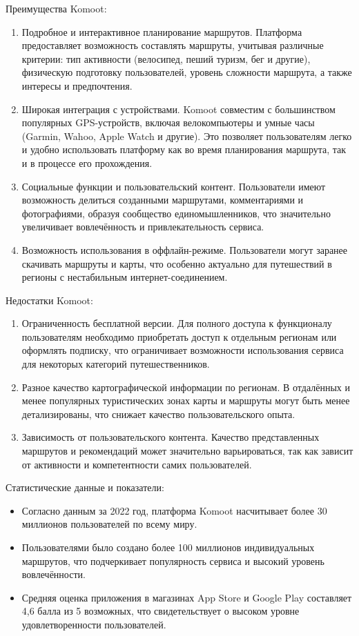 Преимущества Komoot:
\begin{enumerate}
    \item Подробное и интерактивное планирование маршрутов. Платформа предоставляет возможность составлять маршруты, учитывая различные критерии: тип активности (велосипед, пеший туризм, бег и другие), физическую подготовку пользователей, уровень сложности маршрута, а также интересы и предпочтения.
    \item Широкая интеграция с устройствами. Komoot совместим с большинством популярных GPS-устройств, включая велокомпьютеры и умные часы (Garmin, Wahoo, Apple Watch и другие). Это позволяет пользователям легко и удобно использовать платформу как во время планирования маршрута, так и в процессе его прохождения.
    \item Социальные функции и пользовательский контент. Пользователи имеют возможность делиться созданными маршрутами, комментариями и фотографиями, образуя сообщество единомышленников, что значительно увеличивает вовлечённость и привлекательность сервиса.
    \item Возможность использования в оффлайн-режиме. Пользователи могут заранее скачивать маршруты и карты, что особенно актуально для путешествий в регионы с нестабильным интернет-соединением.
\end{enumerate}

Недостатки Komoot:
\begin{enumerate}
    \item Ограниченность бесплатной версии. Для полного доступа к функционалу пользователям необходимо приобретать доступ к отдельным регионам или оформлять подписку, что ограничивает возможности использования сервиса для некоторых категорий путешественников.
    \item Разное качество картографической информации по регионам. В отдалённых и менее популярных туристических зонах карты и маршруты могут быть менее детализированы, что снижает качество пользовательского опыта.
    \item Зависимость от пользовательского контента. Качество представленных маршрутов и рекомендаций может значительно варьироваться, так как зависит от активности и компетентности самих пользователей.
\end{enumerate}

Статистические данные и показатели:
\begin{itemize}
    \item Согласно данным за 2022 год, платформа Komoot насчитывает более 30 миллионов пользователей по всему миру.
    \item Пользователями было создано более 100 миллионов индивидуальных маршрутов, что подчеркивает популярность сервиса и высокий уровень вовлечённости.
    \item Средняя оценка приложения в магазинах App Store и Google Play составляет 4,6 балла из 5 возможных, что свидетельствует о высоком уровне удовлетворенности пользователей.
\end{itemize}

